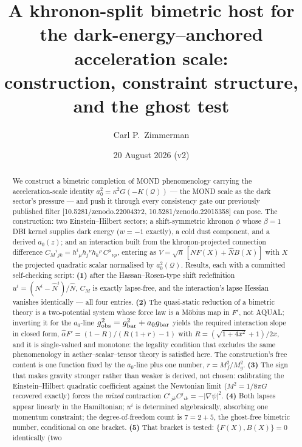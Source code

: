 \documentclass[aps,prd,twocolumn,10pt,nofootinbib,superscriptaddress]{revtex4-2}
\newcommand{\QQ}{\mathcal{Q}}
\begin{document}
\title{A khronon-split bimetric host for the dark-energy--anchored acceleration scale:\\
construction, constraint structure, and the ghost test}

\author{Carl P.\ Zimmerman}
\date{20 August 2026 (v2)}

\begin{abstract}
We construct a bimetric completion of MOND phenomenology carrying the acceleration-scale
identity $a_0^2=\kappa^2G(-K(\QQ))$ --- the MOND scale as the dark sector's pressure --- and
push it through every consistency gate our previously published filter
[10.5281/zenodo.22004372, 10.5281/zenodo.22015358] can pose. The construction: two
Einstein--Hilbert sectors; a shift-symmetric khronon $\phi$ whose $\beta=1$ DBI kernel supplies
dark energy ($w=-1$ exactly), a cold dust component, and a derived $a_0(z)$; and an interaction
built from the khronon-projected connection difference
$C_M{}^i{}_{jk}=h^i{}_\mu h_j{}^\nu h_k{}^\rho\,C^\mu{}_{\nu\rho}$, entering as
$V=\sqrt{h}\,[N F(X)+\hat N B(X)]$ with $X$ the projected quadratic scalar normalised by
$a_0^2(\QQ)$. Results, each with a committed self-checking script: \textbf{(1)} after the
Hassan--Rosen-type shift redefinition $u^i=(N^i-\hat N^i)/\hat N$, $C_M$ is exactly lapse-free,
and the interaction's lapse Hessian vanishes identically --- all four entries. \textbf{(2)} The
quasi-static reduction of a bimetric theory is a two-potential system whose force law is a
M\"obius map in $F'$, not AQUAL; inverting it for the $a_0$-line
$g_{\rm obs}^2=g_{\rm bar}^2+a_0g_{\rm bar}$ yields the required interaction slope in closed
form, $\hat\alpha F'=(1-R)/(R(1+r)-1)$ with $R=(\sqrt{1+4x^2}+1)/2x$, and it is single-valued
and monotone: the legality condition that excludes the same phenomenology in
aether--scalar--tensor theory is satisfied here. The construction's free content is one function
fixed by the $a_0$-line plus one number, $r=M_f^2/M_g^2$. \textbf{(3)} The sign that makes
gravity stronger rather than weaker is derived, not chosen: calibrating the Einstein--Hilbert
quadratic coefficient against the Newtonian limit ($M^2=1/8\pi G$ recovered exactly) forces the
\emph{mixed} contraction $C^i{}_{jk}C^j{}_{ik}=-|\nabla\psi|^2$. \textbf{(4)} Both lapses appear
linearly in the Hamiltonian; $u^i$ is determined algebraically, absorbing one momentum
constraint; the degree-of-freedom count is $7=2+5$, the ghost-free bimetric number, conditional
on one bracket. \textbf{(5)} That bracket is tested: $\{F(X),B(X)\}=0$ identically (two

\end{abstract}
\end{document}
